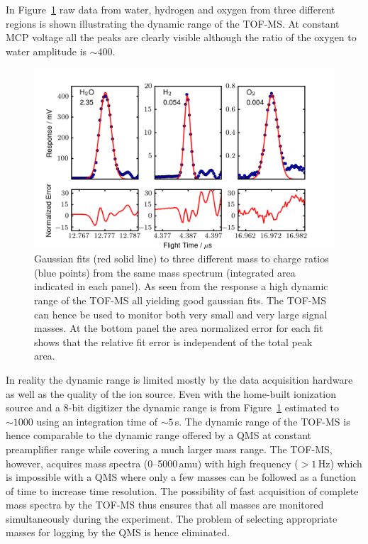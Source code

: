 \documentclass[aip,rsi]{revtex4-1}
\begin{document}
In Figure~\ref{fig:dynamic_range} raw data from water, hydrogen and oxygen from three different regions is shown illustrating the dynamic range of the TOF-MS. At constant MCP voltage all the peaks are clearly visible although the ratio of the oxygen to water amplitude is $\sim$400. 
\begin{figure}
 \includegraphics[width=14cm]{dynamic_range.png}%
 \caption{Gaussian fits (red solid line) to three different mass to charge ratios (blue points) from the same mass spectrum (integrated area indicated in each panel). As seen from the response a high dynamic range of the TOF-MS all yielding good gaussian fits. The TOF-MS can hence be used to monitor both very small and very large signal masses. At the bottom panel the area normalized error for each fit shows that the relative fit error is independent of the total peak area.\label{fig:dynamic_range}}%
\end{figure}
In reality the dynamic range is limited mostly by the data acquisition hardware as well as the quality of the ion source. Even with the home-built ionization source and a 8-bit digitizer the dynamic range is from Figure~\ref{fig:dynamic_range} estimated to $\sim1000$ using an integration time of $\sim5$\,s. The dynamic range of the TOF-MS is hence comparable to the dynamic range offered by a QMS at constant preamplifier range while covering a much larger mass range. The TOF-MS, however, acquires mass spectra (\mbox{0--5000}\,amu) with high frequency ($>1$\,Hz) which is impossible with a QMS where only a few masses can be followed as a function of time to increase time resolution. The possibility of fast acquisition of complete mass spectra by the TOF-MS thus ensures that all masses are monitored simultaneously during the experiment. The problem of selecting appropriate masses for logging by the QMS is hence eliminated.
\end{document}
